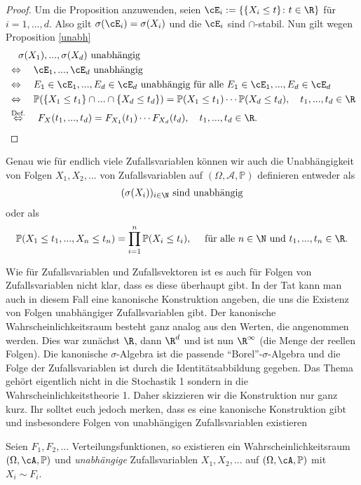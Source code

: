 \begin{proof}
Um die Proposition anzuwenden, seien $\cE_i := \{ \{X_i \leq t \}\colon t \in \R \}$ f\"ur $i=1,...,d$. Also gilt $\sigma(\cE_i) = \sigma(X_i)$ und die $\cE_i$ sind $\cap$-stabil. Nun gilt wegen Proposition \ref{unabh}
\begin{align*}
	&\quad \sigma(X_1),...,\sigma(X_d) \text{ unabhängig }\\
	&\Leftrightarrow\quad \cE_1,...,\cE_d \text{ unabhängig}\\
	&\Leftrightarrow\quad E_1 \in \cE_1, ..., E_d\in \cE_d\text{ unabh\"angig f\"ur alle } E_1\in \cE_1, ..., E_d\in \cE_d\\
	&\Leftrightarrow\quad \mathbb{P}(\{ X_1 \leq t_1 \} \cap ... \cap \{ X_d \leq t_d \})=\mathbb P(X_1\leq t_1)\cdots \mathbb P(X_d\leq t_d),\quad t_1,..., t_d\in \R\\
	&\overset{\text{Def.}}{\Leftrightarrow} \quad F_X(t_1,..., t_d)=F_{X_1}(t_1)\cdots F_{X_d}(t_d),\quad t_1,..., t_d\in \R.
\end{align*}	
\end{proof}
\begin{bem}
	Genau wie f\"ur endlich viele Zufallsvariablen k\"onnen wir auch die Unabh\"angigkeit von Folgen $X_1, X_2, ...$ von Zufallsvariablen auf $(\Omega, \mathcal A, \mathbb P)$ definieren entweder als 
	\begin{align*}
		(\sigma(X_i))_{i\in \N} \text{ sind unabh\"angig}
	\end{align*}
	oder als 
	\begin{align*}
		\mathbb P(X_1 \leq t_1, ..., X_n\leq t_n)=\prod_{i=1}^n \mathbb P(X_i \leq t_i),\quad \text{ f\"ur alle } n\in\N \text{ und } t_1, ..., t_n\in\R.
	\end{align*}
\end{bem}
Wie f\"ur Zufallsvariablen und Zufallsvektoren ist es auch f\"ur Folgen von Zufallsvariablen nicht klar, dass es diese \"uberhaupt gibt. In der Tat kann man auch in diesem Fall eine kanonische Konstruktion angeben, die uns die Existenz von Folgen unabh\"angiger Zufallsvariablen gibt. Der kanonische Wahrscheinlichkeitsraum besteht ganz analog aus den Werten, die angenommen werden. Dies war zun\"achst $\R$, dann $\R^d$ und ist nun $\R^\infty$ (die Menge der reellen Folgen). Die kanonische $\sigma$-Algebra ist die passende \enquote{Borel}-$\sigma$-Algebra und die Folge der Zufallsvariablen ist durch die Identit\"atsabbildung gegeben. Das Thema geh\"ort eigentlich nicht in die Stochastik 1 sondern in die Wahrscheinlichkeitstheorie 1. Daher skizzieren wir die Konstruktion nur ganz kurz. Ihr solltet euch jedoch merken, dass es eine kanonische Konstruktion gibt und insbesondere Folgen von unabh\"angigen Zufallsvariablen existieren
\begin{satz}
	Seien $F_1,F_2,...$ Verteilungsfunktionen, so existieren ein Wahrscheinlichkeitsraum $(\Omega, \cA, \mathbb{P})$ und \textit{unabhängige} Zufallsvariablen $X_1,X_2,...$ auf $(\Omega, \cA, \mathbb{P})$ mit $X_i \sim F_i$.
\end{satz}


